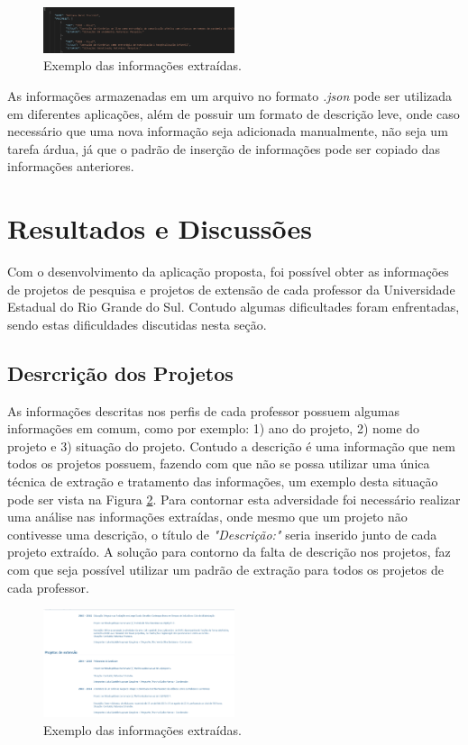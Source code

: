 \documentclass[conference]{IEEEtran}
\begin{document}
\begin{figure}[htbp]
\centerline{\includegraphics[width=0.5\textwidth]{json.png}}
\caption{Exemplo das informações extraídas.}
\label{json}
\end{figure}

As informações armazenadas em um arquivo no formato \textit{.json} pode ser utilizada em diferentes aplicações, além de possuir um formato de descrição leve, onde caso necessário que uma nova informação seja adicionada manualmente, não seja um tarefa árdua, já que o padrão de inserção de informações pode ser copiado das informações anteriores.
\section{Resultados e Discussões}

Com o desenvolvimento da aplicação proposta, foi possível obter as informações de projetos de pesquisa e projetos de extensão de cada professor da Universidade Estadual do Rio Grande do Sul. Contudo algumas dificultades foram enfrentadas, sendo estas dificuldades discutidas nesta seção.

\subsection{Desrcrição dos Projetos}
As informações descritas nos perfis de cada professor possuem algumas informações em comum, como por exemplo: 1) ano do projeto, 2) nome do projeto e 3) situação do projeto. Contudo a descrição é uma informação que nem todos os projetos possuem, fazendo com que não se possa utilizar uma única técnica de extração e tratamento das informações, um exemplo desta situação pode ser vista na Figura \ref{prob1}. Para contornar esta adversidade foi necessário realizar uma análise nas informações extraídas, onde mesmo que um projeto não contivesse uma descrição, o título de \textit{"Descrição:"} seria inserido junto de cada projeto extraído. A solução para contorno da falta de descrição nos projetos, faz com que seja possível utilizar um padrão de extração para todos os projetos de cada professor.

\begin{figure}[htbp]
\centerline{\includegraphics[width=0.5\textwidth]{exemplo1.png}}
\caption{Exemplo das informações extraídas.}
\label{prob1}
\end{figure}
\end{document}
